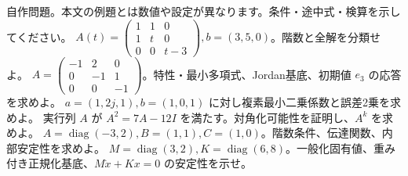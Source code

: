 \documentclass[11pt]{article}
\begin{document}
自作問題。本文の例題とは数値や設定が異なります。条件・途中式・検算を示してください。
\problem[総合1：文字入り連立式]
$A(t)=\begin{pmatrix}1&1&0\\1&t&0\\0&0&t-3\end{pmatrix},b=(3,5,0)$。階数と全解を分類せよ。
\workspace{45mm}
\problem[総合2：Jordanと応答]
$A=\begin{pmatrix}-1&2&0\\0&-1&1\\0&0&-1\end{pmatrix}$。特性・最小多項式、Jordan基底、初期値 $e_3$ の応答を求めよ。
\workspace{45mm}
\newpage
\problem[総合3：複素近似]
$a=(1,2j,1),b=(1,0,1)$ に対し複素最小二乗係数と誤差2乗を求めよ。
\workspace{45mm}
\problem[総合4：証明と累乗]
実行列 $A$ が $A^2=7A-12I$ を満たす。対角化可能性を証明し、$A^k$ を求めよ。
\workspace{45mm}
\newpage
\problem[総合5：内部と入出力]
$A=\operatorname{diag}(-3,2),B=(1,1),C=(1,0)$。階数条件、伝達関数、内部安定性を求めよ。
\workspace{45mm}
\problem[総合6：エネルギーと重み]
$M=\operatorname{diag}(3,2),K=\operatorname{diag}(6,8)$。一般化固有値、重み付き正規化基底、$M\dot x+Kx=0$ の安定性を示せ。
\workspace{45mm}
\end{document}
